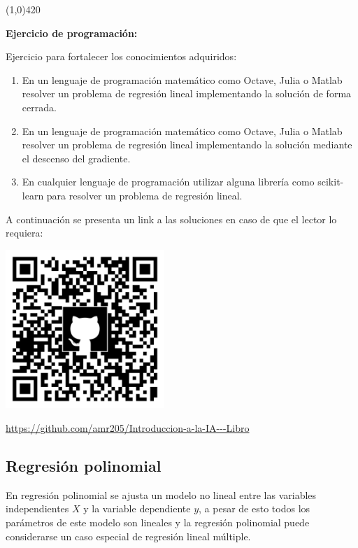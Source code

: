 \documentclass[11pt,fleqn]{book} %
\begin{document}
\begin{center}
\line(1,0){420}
\end{center}

\textbf{Ejercicio de programación:}

Ejercicio para fortalecer los conocimientos adquiridos:

\begin{enumerate}
\item En un lenguaje de programación matemático como Octave, Julia o Matlab resolver un problema de regresión lineal implementando la solución de forma cerrada.
\item En un lenguaje de programación matemático como Octave, Julia o Matlab resolver un problema de regresión lineal implementando la solución mediante el descenso del gradiente.
\item En cualquier lenguaje de programación utilizar alguna librería como scikit-learn para resolver un problema de regresión lineal.
\end{enumerate}

A continuación se presenta un link a las soluciones en caso de que el lector lo requiera:

\includegraphics[width=6cm]{Pictures/github/libro-ia.png}

\url{https://github.com/amr205/Introduccion-a-la-IA---Libro}

\clearpage

\subsection{Regresión polinomial} 

En regresión polinomial se ajusta un modelo no lineal entre las variables independientes $X$ y la variable dependiente $y$, a pesar de esto todos los parámetros de este modelo son lineales y la regresión polinomial puede considerarse un caso especial de regresión lineal múltiple.
\end{document}
